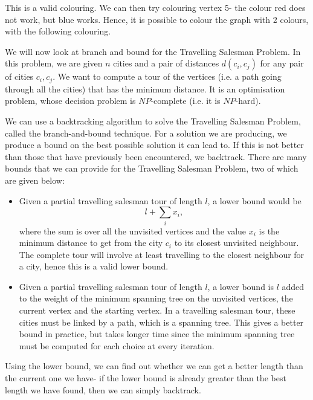 \documentclass[a4paper, openany]{memoir}
\begin{document}
    \noindent This is a valid colouring. We can then try colouring vertex 5- the colour red does not work, but blue works. Hence, it is possible to colour the graph with 2 colours, with the following colouring.
    \begin{figure}[H]
        \centering
    \end{figure}

    We will now look at branch and bound for the Travelling Salesman Problem. In this problem, we are given $n$ cities and a pair of distances $d(c_i, c_j)$ for any pair of cities $c_i, c_j$. We want to compute a tour of the vertices (i.e. a path going through all the cities) that has the minimum distance. It is an optimisation problem, whose decision problem is $NP$-complete (i.e. it is $NP$-hard).

    We can use a backtracking algorithm to solve the Travelling Salesman Problem, called the branch-and-bound technique. For a solution we are producing, we produce a bound on the best possible solution it can lead to. If this is not better than those that have previously been encountered, we backtrack. There are many bounds that we can provide for the Travelling Salesman Problem, two of which are given below:
    \begin{itemize}
        \item Given a partial travelling salesman tour of length $l$, a lower bound would be
        \[l + \sum_i x_i,\]
        where the sum is over all the unvisited vertices and the value $x_i$ is the minimum distance to get from the city $c_i$ to its closest unvisited neighbour. The complete tour will involve at least travelling to the closest neighbour for a city, hence this is a valid lower bound.
        \item Given a partial travelling salesman tour of length $l$, a lower bound is $l$ added to the weight of the minimum spanning tree on the unvisited vertices, the current vertex and the starting vertex. In a travelling salesman tour, these cities must be linked by a path, which is a spanning tree. This gives a better bound in practice, but takes longer time since the minimum spanning tree must be computed for each choice at every iteration.
    \end{itemize}
    Using the lower bound, we can find out whether we can get a better length than the current one we have- if the lower bound is already greater than the best length we have found, then we can simply backtrack.
\end{document}
